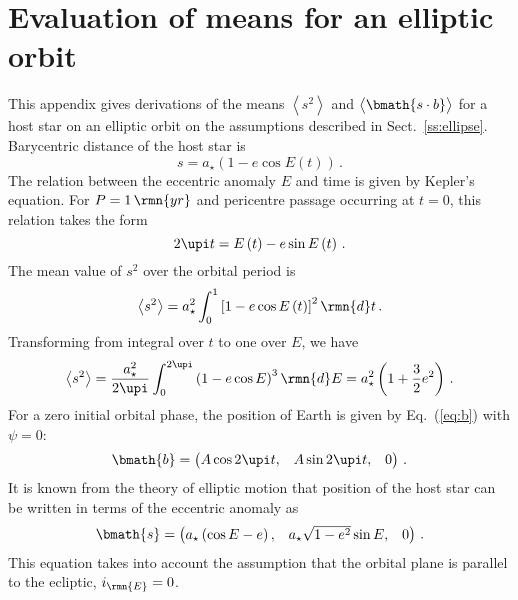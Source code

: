 \documentclass[fleqn,usenatbib,useAMS,usedcolumn]{mnras}
\begin{document}
\section{Evaluation of means for an elliptic orbit}
\label{app:ellipse}

This appendix gives derivations of the means $\left\langle s^2\right\rangle$ and $\left\langle\bmath{s\cdot b}\vphantom{s^2}\right\rangle$ for a host star on an elliptic orbit on the assumptions described in Sect.~\ref{ss:ellipse}.
Barycentric distance of the host star is
\begin{equation}
  s=a_\star\left(1-e\cos E\left(t\right)\right)\,.
\end{equation}
The relation between the eccentric anomaly $E$ and time is given by Kepler's equation. For $P=1\,\rmn{yr}$ and pericentre passage occurring at $t=0$, this relation takes the form
\begin{equation}
  2\upi t=E\left(t\right)-e\sin E\left(t\right)\,.
\end{equation}
The mean value of $s^2$ over the orbital period is
\begin{equation}
  \left\langle s^2\right\rangle=a_\star^2\int_0^1\left[1-e\cos E\left(t\right)\right]^2\rmn{d}t\,.
\end{equation}
Transforming from integral over $t$ to one over $E$, we have
\begin{equation}\label{eq:app-ell-s2}
  \left\langle s^2\right\rangle
  =\frac{a_\star^2}{2\upi}\int_0^{2\upi}\left(1-e\cos E\right)^3\rmn{d}E
  =a_\star^2\left(1+\frac{3}{2}e^2\right)\,.
\end{equation}
For a zero initial orbital phase, the position of Earth is given by Eq.~(\ref{eq:b}) with $\psi=0$:
\begin{equation}
 \bmath{b}=
 \begin{pmatrix}
    A\cos 2\upi t, &
    A\sin 2\upi t, &
    0
 \end{pmatrix}\,.
\end{equation}
It is known from the theory of elliptic motion that position of the host star can be written in terms of the eccentric anomaly as
\begin{equation}
 \bmath{s}=
 \begin{pmatrix}
    a_\star\left(\cos E-e\right), &
    a_\star\sqrt{1-e^2}\sin E, &
    0
 \end{pmatrix}\,.
\end{equation}
This equation takes into account the assumption that the orbital plane is parallel to the ecliptic, $i_\rmn{E}=0$.
\end{document}
